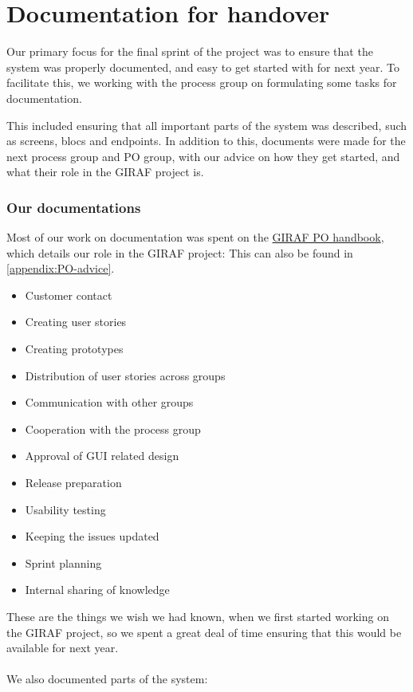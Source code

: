 \section{Documentation for handover}
Our primary focus for the final sprint of the project was to ensure that the system was properly documented, and easy to get started with for next year.
To facilitate this, we working with the process group on formulating some tasks for documentation.

This included ensuring that all important parts of the system was described, such as screens, blocs and endpoints.
In addition to this, documents were made for the next process group and PO group, with our advice on how they get started, and what their role in the GIRAF project is.

\subsubsection{Our documentations}
Most of our work on documentation was spent on the \href{https://github.com/aau-giraf/wiki/blob/master/advice_for_future_giraf/PO_advice.md}{GIRAF PO handbook}, which details our role in the GIRAF project:
This can also be found in \autoref{appendix:PO-advice}.

\begin{itemize}
    \item Customer contact
    \item Creating user stories 
    \item Creating prototypes
    \item Distribution of user stories across groups
    \item Communication with other groups
    \item Cooperation with the process group
    \item Approval of GUI related design
    \item Release preparation
    \item Usability testing
    \item Keeping the issues updated
    \item Sprint planning
    \item Internal sharing of knowledge
\end{itemize}

These are the things we wish we had known, when we first started working on the GIRAF project, so we spent a great deal of time ensuring that this would be available for next year.
\\\\
We also documented parts of the system:

